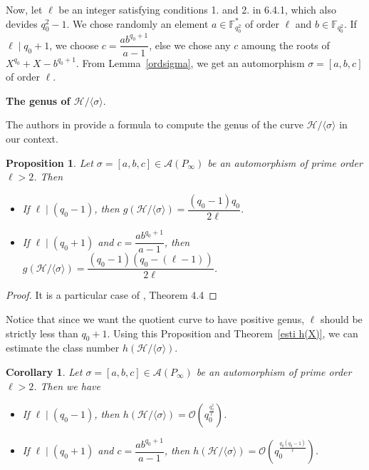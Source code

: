 \documentclass[10pt]{article}
\newtheorem{prop1}[thm]{Proposition}
\newtheorem{coro1}[thm]{Corollary}
\theoremstyle{definition}
\theoremstyle{definition}
\theoremstyle{definition}
\newcommand{\s}{\vspace{0.3cm}}
\newcommand{\calA}{\mathcal{A}}
\newcommand{\calH}{\mathcal{H}}
\newcommand{\calO}{\mathcal{O}}
\begin{document}
Now, let $\ell$ be an integer satisfying conditions 1. and 2. in 6.4.1, which also devides $q_0^2-1$. We chose randomly an element $a \in \mathbb{F}_{q_0^2}^*$ of order $\ell$ and $b \in \mathbb{F}_{q_0^2}$. If $\ell \mid q_0+1$, we choose $c=\dfrac{ab^{q_0+1}}{a-1}$, else we chose any $c$ amoung the roots of $X^{q_0}+X-b^{q_0+1}$. From Lemma~\ref{ordsigma}, we get an automorphism $\sigma = [a,b,c]$ of order $\ell$.

\s

\textbf{The genus of $\calH/\langle \sigma \rangle$}.

\s

The authors in \cite{Gar} provide a formula to compute the genus of the curve $\calH/\langle \sigma \rangle$ in our context.

\s

\begin{prop1} \label{genus}
Let $\sigma = [a,b,c] \in \calA(P_{\infty})$ be an automorphism of prime order $\ell > 2$. Then 
\begin{itemize}
\item[(i)] If $\ell \mid (q_0-1)$, then $g(\calH/\langle \sigma \rangle) = \dfrac{(q_0-1)q_0}{2\ell}$.
\item[(ii)] If $\ell \mid (q_0+1)$ and $c = \dfrac{ab^{q_0+1}}{a-1}$, then $g(\calH/\langle \sigma \rangle) = \dfrac{(q_0-1)(q_0-(\ell-1))}{2\ell}$.
\end{itemize}
\end{prop1}

\s

\begin{proof}
It is a particular case of \cite{Gar}, Theorem 4.4
\end{proof}

Notice that since we want the quotient curve to have positive genus, $\ell$ should be strictly less than $q_0+1$. Using this Proposition and Theorem~\ref{esti h(X)}, we can estimate the class number $h(\calH/\langle \sigma \rangle)$.

\s

\begin{coro1} \label{lastcorollary}
Let $\sigma = [a,b,c] \in \calA(P_{\infty})$ be an automorphism of prime order $\ell > 2$. Then we have 
\begin{itemize}
\item[(i)] If $\ell \mid (q_0-1)$, then $h(\calH/\langle \sigma \rangle) = \calO \left(q_0^{\frac{q_0^2}{\ell}}\right)$.
\item[(ii)] If $\ell \mid (q_0+1)$ and $c=\dfrac{ab^{q_0+1}}{a-1}$, then $h(\calH/\langle \sigma \rangle) = \calO \left(q_0^{\frac{q_0(q_0-1)}{\ell}}\right)$.
\end{itemize}
\end{coro1}
\end{document}
